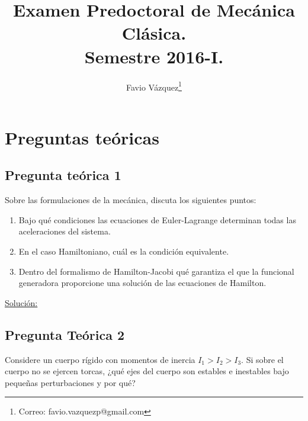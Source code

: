 \documentclass[a4paper,10pt]{article}
\title{Examen Predoctoral de Mecánica Clásica. \\
Semestre 2016-I.}
\author{Favio Vázquez\thanks{Correo: favio.vazquezp@gmail.com}}\affil{Instituto de Ciencias Nucleares. Universidad Nacional Autónoma de México.}
\date{}
\numberwithin{equation}{section}
\begin{document}
\makeatletter
\def\@maketitle{%
  \newpage
  \null
  \vskip 2em%
  \begin{center}%
  \let \footnote \thanks
    {\Large\bfseries \@title \par}%
    \vskip 1.5em%
    {\normalsize
      \lineskip .5em%
      \begin{tabular}[t]{c}%
        \@author
      \end{tabular}\par}%
    \vskip 1em%
    {\normalsize \@date}%
  \end{center}%
  \par
  \vskip 1.5em}
\makeatother

\maketitle

\section{Preguntas teóricas}

\subsection{Pregunta teórica 1}

Sobre las formulaciones de la mecánica, discuta los siguientes puntos:

\begin{enumerate}[label=\alph*)]
 \item Bajo qué condiciones las ecuaciones de Euler-Lagrange determinan todas las aceleraciones del
 sistema.
 \item En el caso Hamiltoniano, cuál es la condición equivalente.
 \item Dentro del formalismo de Hamilton-Jacobi qué garantiza el que la funcional generadora
 proporcione una solución de las ecuaciones de Hamilton.
\end{enumerate}

\vspace{.3cm}

\underline{Solución:} \vspace{.3cm}

\subsection{Pregunta Teórica 2}

Considere un cuerpo rígido con momentos de inercia $I_1 > I_2 > I_3$. Si sobre el cuerpo no se 
ejercen torcas, ¿qué ejes del cuerpo son estables e inestables bajo pequeñas perturbaciones y 
por qué?
\end{document}
